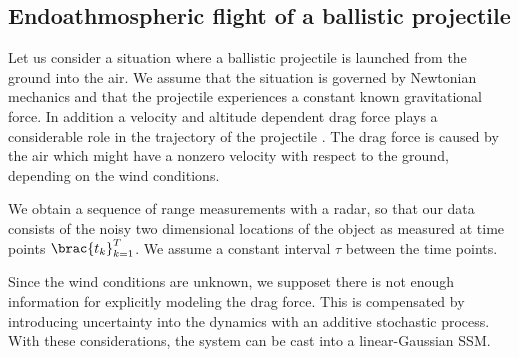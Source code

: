 
\subsection{Endoathmospheric flight of a ballistic projectile}\label{sec:ballistic}
Let us consider a situation where a ballistic projectile is launched
from the ground into the air. We assume that the situation is governed by Newtonian
mechanics and that the projectile experiences a constant known gravitational
force. In addition a velocity and altitude dependent drag force plays
a considerable role in the trajectory of the projectile \parencite{ristic2004beyond}. 
The drag force is caused by the air which might have a nonzero velocity with respect to the ground,
depending on the wind conditions.
 
We obtain a sequence of range measurements with a radar,
so that our data consists of the noisy two dimensional locations 
of the object as measured at time points $\brac{t_k}_{k=1}^T$.
We assume a constant interval $\tau$ between the time points.

Since the wind conditions are unknown, we supposet there is not
enough information for explicitly modeling the drag force. 
This is compensated by introducing
uncertainty into the dynamics with an additive stochastic process.
With these considerations, the system can be cast into a linear-Gaussian
SSM. 


